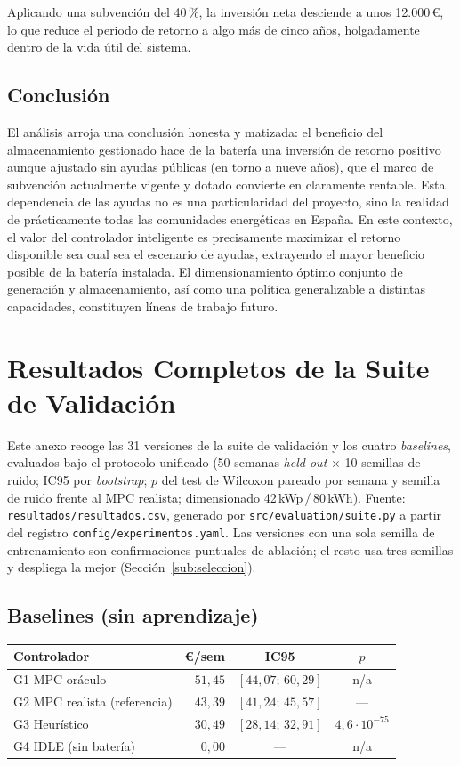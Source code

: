 \documentclass[12pt, a4paper, twoside]{report}
\begin{document}
Aplicando una subvención del 40\,\%, la inversión neta desciende a unos
12.000\,€, lo que reduce el periodo de retorno a algo más de cinco años,
holgadamente dentro de la vida útil del sistema.

\section{Conclusión}

El análisis arroja una conclusión honesta y matizada: el beneficio del
almacenamiento gestionado hace de la batería una inversión de retorno positivo
aunque ajustado sin ayudas públicas (en torno a nueve años), que el marco de
subvención actualmente vigente y dotado convierte en claramente rentable. Esta
dependencia de las ayudas no es una particularidad del proyecto, sino la
realidad de prácticamente todas las comunidades energéticas en España. En este
contexto, el valor del controlador inteligente es precisamente maximizar el
retorno disponible sea cual sea el escenario de ayudas, extrayendo el mayor
beneficio posible de la batería instalada. El dimensionamiento óptimo conjunto
de generación y almacenamiento, así como una política generalizable a distintas
capacidades, constituyen líneas de trabajo futuro.

\chapter{Resultados Completos de la Suite de Validación}
\label{app:suite_completa}

Este anexo recoge las 31 versiones de la suite de validación y los cuatro
\textit{baselines}, evaluados bajo el protocolo unificado (50 semanas
\textit{held-out} $\times$ 10 semillas de ruido; IC95 por \textit{bootstrap};
$p$ del test de Wilcoxon pareado por semana y semilla de ruido frente al MPC realista;
dimensionado 42\,kWp\,/\,80\,kWh). Fuente: \texttt{resultados/resultados.csv},
generado por \texttt{src/evaluation/suite.py} a partir del registro
\texttt{config/experimentos.yaml}. Las versiones con una sola semilla de
entrenamiento son confirmaciones puntuales de ablación; el resto usa tres
semillas y despliega la mejor (Sección~\ref{sub:seleccion}).

\section{Baselines (sin aprendizaje)}

\begin{table}[H]
\centering\small
\begin{tabular}{lrcc}
\toprule
\textbf{Controlador} & \textbf{€/sem} & \textbf{IC95} & \textbf{$p$} \\
\midrule
G1 MPC oráculo & $51{,}45$ & $[44{,}07;\,60{,}29]$ & n/a \\
G2 MPC realista (referencia) & $43{,}39$ & $[41{,}24;\,45{,}57]$ & --- \\
G3 Heurístico & $30{,}49$ & $[28{,}14;\,32{,}91]$ & $4{,}6\cdot10^{-75}$ \\
G4 IDLE (sin batería) & $0{,}00$ & --- & n/a \\
\bottomrule
\end{tabular}
\end{table}
\end{document}
